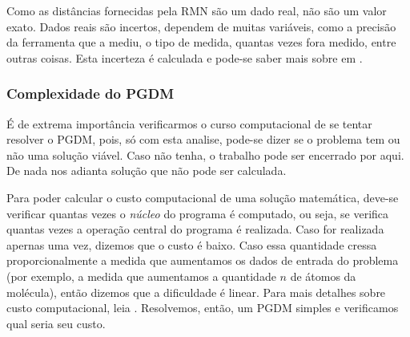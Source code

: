 \documentclass[a4paper,12pt]{article}
\begin{document}
	Como as distâncias fornecidas pela RMN são um dado real, não são um valor exato. Dados reais são incertos, dependem de muitas variáveis, como a precisão da ferramenta que a mediu, o tipo de medida, quantas vezes fora medido, entre outras coisas. Esta incerteza é calculada e pode-se saber mais sobre em \cite{EstatisticaTratamentoDeDados}.
	
	\subsubsection*{Complexidade do PGDM}
	É de extrema importância verificarmos o curso computacional de se tentar resolver o PGDM, pois, só com esta analise, pode-se dizer se o problema tem ou não uma solução viável. Caso não tenha, o trabalho pode ser encerrado por aqui. De nada nos adianta solução que não pode ser calculada.
	
	Para poder calcular o custo computacional de uma solução matemática, deve-se verificar quantas vezes o \textit{núcleo} do programa é computado, ou seja, se verifica quantas vezes a operação central do programa é realizada. Caso for realizada apernas uma vez, dizemos que o custo é baixo. Caso essa quantidade cressa proporcionalmente a medida que aumentamos os dados de entrada do problema (por exemplo, a medida que aumentamos a quantidade $n$ de átomos da molécula), então dizemos que a dificuldade é linear. Para mais detalhes sobre custo computacional, leia \cite{ComplexidadeComp}. Resolvemos, então, um PGDM simples e verificamos qual seria seu custo.
	
\end{document}
